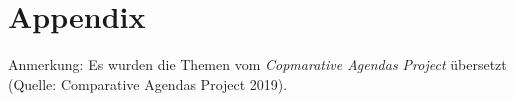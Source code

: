 \newpage
\section{Appendix}

\setcounter{table}{0}
\renewcommand{\thetable}{A\arabic{table}}

\setcounter{figure}{0}
\renewcommand{\thefigure}{A\arabic{figure}}

\begin{ThreePartTable}
\begin{TableNotes}
\footnotesize
\item Anmerkung: Es wurden die Themen vom \textit{Copmarative Agendas Project} übersetzt (Quelle: Comparative Agendas Project 2019).
\end{TableNotes}


\end{ThreePartTable}
